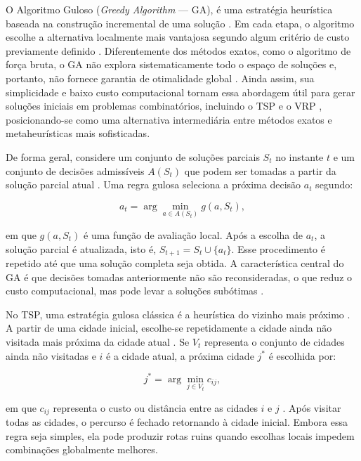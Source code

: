 O Algoritmo Guloso (\textit{Greedy Algorithm} --- GA), é uma estratégia heurística baseada na construção incremental de uma solução \cite{cormen2022introduction}. Em cada etapa, o algoritmo escolhe a alternativa localmente mais vantajosa segundo algum critério de custo previamente definido \cite{rosenkrantz1977analysis}. Diferentemente dos métodos exatos, como o algoritmo de força bruta, o GA não explora sistematicamente todo o espaço de soluções e, portanto, não fornece garantia de otimalidade global \cite{johnson1990traveling}. Ainda assim, sua simplicidade e baixo custo computacional tornam essa abordagem útil para gerar soluções iniciais em problemas combinatórios, incluindo o TSP e o VRP \cite{bentley1992fast}, posicionando-se como uma alternativa intermediária entre métodos exatos e metaheurísticas mais sofisticadas.

De forma geral, considere um conjunto de soluções parciais $S_t$ no instante $t$ e um conjunto de decisões admissíveis $A(S_t)$ que podem ser tomadas a partir da solução parcial atual \cite{korte2008combinatorial}. Uma regra gulosa seleciona a próxima decisão $a_t$ segundo:

\begin{equation*}
    a_t = \arg\min_{a \in A(S_t)} g(a,S_t),
\end{equation*}

\noindent em que $g(a,S_t)$ \cite{pearl1983heuristics} é uma função de avaliação local. Após a escolha de $a_t$, a solução parcial é atualizada, isto é, $S_{t+1} = S_t \cup \{a_t\}$. Esse procedimento é repetido até que uma solução completa seja obtida. A característica central do GA é que decisões tomadas anteriormente não são reconsideradas, o que reduz o custo computacional, mas pode levar a soluções subótimas \cite{hillier2005introduction, vazirani2001approximation}.

No TSP, uma estratégia gulosa clássica é a heurística do vizinho mais próximo \cite{rosenkrantz1977analysis}. A partir de uma cidade inicial, escolhe-se repetidamente a cidade ainda não visitada mais próxima da cidade atual \cite{applegate2011traveling}. Se $V_t$ representa o conjunto de cidades ainda não visitadas e $i$ é a cidade atual, a próxima cidade $j^*$ é escolhida por:

\begin{equation*}
    j^* = \arg\min_{j \in V_t} c_{ij},
\end{equation*}

\noindent em que $c_{ij}$ representa o custo ou distância entre as cidades $i$ e $j$ \cite{bentley1992fast}. Após visitar todas as cidades, o percurso é fechado retornando à cidade inicial. Embora essa regra seja simples, ela pode produzir rotas ruins quando escolhas locais impedem combinações globalmente melhores.

